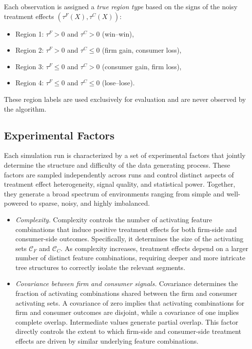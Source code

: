\documentclass[11pt,letterpaper,english]{article}
\theoremstyle{definition}
\theoremstyle{definition}
\begin{document}
\begin{bibunit}
Each observation is assigned a \emph{true region type} based on the signs of the noisy treatment effects $(\tau^F(X), \tau^C(X))$:
\begin{itemize}
    \item Region 1: $\tau^F > 0$ and $\tau^C > 0$ (win--win),
    \item Region 2: $\tau^F > 0$ and $\tau^C \leq 0$ (firm gain, consumer loss),
    \item Region 3: $\tau^F \leq 0$ and $\tau^C > 0$ (consumer gain, firm loss),
    \item Region 4: $\tau^F \leq 0$ and $\tau^C \leq 0$ (lose--lose).
\end{itemize}

These region labels are used exclusively for evaluation and are never observed by the algorithm.

\subsection{Experimental Factors}
\label{sec:binary-factors}

Each simulation run is characterized by a set of experimental factors that jointly determine the structure and difficulty of the data generating process. These factors are sampled independently across runs and control distinct aspects of treatment effect heterogeneity, signal quality, and statistical power. Together, they generate a broad spectrum of environments ranging from simple and well-powered to sparse, noisy, and highly imbalanced.

\begin{itemize}
    \item \emph{Complexity.}  
    Complexity controls the number of activating feature combinations that induce positive treatment effects for both firm-side and consumer-side outcomes. Specifically, it determines the size of the activating sets $\mathcal{C}_F$ and $\mathcal{C}_C$. As complexity increases, treatment effects depend on a larger number of distinct feature combinations, requiring deeper and more intricate tree structures to correctly isolate the relevant segments.

    \item \emph{Covariance between firm and consumer signals.}  
    Covariance determines the fraction of activating combinations shared between the firm and consumer activating sets. A covariance of zero implies that activating combinations for firm and consumer outcomes are disjoint, while a covariance of one implies complete overlap. Intermediate values generate partial overlap. This factor directly controls the extent to which firm-side and consumer-side treatment effects are driven by similar underlying feature combinations.


\end{itemize}
\end{bibunit}
\end{document}
